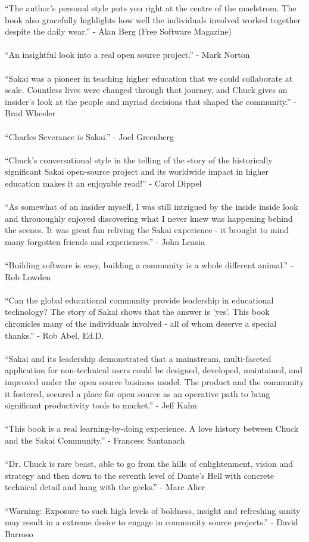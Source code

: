 \documentclass[12pt]{book}
\begin{document}
``The author's personal style puts you right at the centre of the maelstrom. 
The book also gracefully highlights how well the individuals involved worked 
together despite the daily wear.'' - Alan Berg (Free Software Magazine)\\
\\
``An insightful look into a real open source project.''  - Mark Norton\\
\\
``Sakai was a pioneer in teaching higher education that we could
collaborate at scale. Countless lives were changed through that
journey, and Chuck gives an insider's look at the people and myriad
decisions that shaped the community.'' - Brad Wheeler\\
\\
``Charles Severance is Sakai.''  - Joel Greenberg\\
\\
``Chuck's conversational style in the telling
of the story of the historically significant
Sakai open-source project and its worldwide impact in
higher education makes it an enjoyable read!'' - Carol Dippel\\
\\
``As somewhat of an insider myself, I was still intrigued by
the inside inside look and thrououghly enjoyed discovering
what I never knew was happening behind the scenes. It was
great fun reliving the Sakai experience - it brought to
mind many forgotten friends and experiences.'' - John Leasia\\
\\
``Building software is easy, building a community is a
whole different animal.'' - Rob Lowden\\
\\
``Can the global educational community provide leadership
in educational technology? The story of Sakai shows that
the answer is 'yes'. This book chronicles many of the
individuals involved - all of whom deserve
a special thanks.'' - Rob Abel, Ed.D.\\
\\
``Sakai and its leadership demonstrated that a mainstream,
multi-faceted application for non-technical users could
be designed, developed, maintained, and improved under
the open source business model.  The product and the
community it fostered, secured a place for open source as
an operative path to bring significant productivity
tools to market.'' - Jeff Kahn\\
\\
\newpage
``This book is a real learning-by-doing experience.
A love history between Chuck and the
Sakai Community.'' - Francesc Santanach\\
\\
``Dr. Chuck is rare beast, able to go from
the hills of enlightenment, vision and strategy and then
down to the seventh level of Dante's Hell with concrete
technical detail and hang with the geeks.'' - Marc Alier\\
\\
``Warning: Exposure to such high levels of boldness, insight and
refreshing sanity may result in a extreme desire to engage in
community source projects.'' - David Barroso\\
\\

\end{document}
